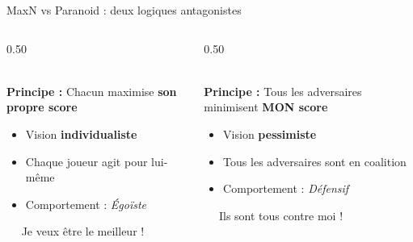 \documentclass[10pt]{beamer}
\begin{document}
\begin{frame}{MaxN vs Paranoid : deux logiques antagonistes}
\vspace{1pt}
    \begin{columns}[T]
        \begin{column}{0.50\textwidth}
            \begin{tcolorbox}[colback=green!5, colframe=donecolor, title=\faUsers\ MaxN, rounded corners]
                \centering
                \vspace{0.1cm}
                {\Huge \faChartLine}\\[0.1cm]
                \textbf{\textcolor{donecolor}{Principe :}} Chacun maximise \textbf{son propre score}\\[0.1cm]
                \begin{itemize}
                    \item Vision \textbf{individualiste}
                    \item Chaque joueur agit pour lui-même
                    \item Comportement : \textcolor{donecolor}{\textit{Égoïste}}
                \end{itemize}
                \vspace{0.5cm}
                \small\faQuoteLeft~~ Je veux être le meilleur ! ~~\faQuoteRight
            \end{tcolorbox}
        \end{column}
        
        \begin{column}{0.50\textwidth}
            \begin{tcolorbox}[colback=orange!5, colframe=todoColor, title=\faShield*\ Paranoid, rounded corners]
                \centering
                \vspace{0.1cm}
                {\Huge \faFrown}\\[0.1cm]
                \textbf{\textcolor{todoColor}{Principe :}} Tous les adversaires minimisent \textbf{MON score}\\[0.2cm]
                \begin{itemize}
                    \item Vision \textbf{pessimiste}
                    \item Tous les adversaires sont en coalition
                    \item Comportement : \textcolor{todoColor}{\textit{Défensif}}
                \end{itemize}
                \vspace{0.3cm}
                \small\faQuoteLeft~~ Ils sont tous contre moi ! ~~\faQuoteRight
            \end{tcolorbox}
        \end{column}
    \end{columns}
\end{frame}
\end{document}
